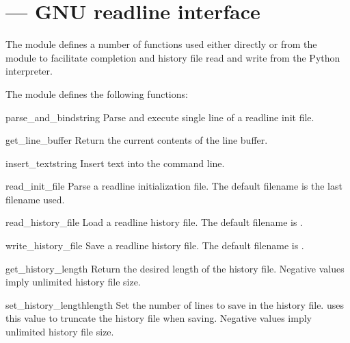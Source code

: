 \section{ ---
         GNU readline interface}



The  module defines a number of functions used either
directly or from the  module to facilitate
completion and history file read and write from the Python
interpreter.

The  module defines the following functions:


\begin{funcdesc}{parse_and_bind}{string}
Parse and execute single line of a readline init file.
\end{funcdesc}

\begin{funcdesc}{get_line_buffer}{}
Return the current contents of the line buffer.
\end{funcdesc}

\begin{funcdesc}{insert_text}{string}
Insert text into the command line.
\end{funcdesc}

\begin{funcdesc}{read_init_file}{}
Parse a readline initialization file.
The default filename is the last filename used.
\end{funcdesc}

\begin{funcdesc}{read_history_file}{}
Load a readline history file.
The default filename is .
\end{funcdesc}

\begin{funcdesc}{write_history_file}{}
Save a readline history file.
The default filename is .
\end{funcdesc}

\begin{funcdesc}{get_history_length}{}
Return the desired length of the history file.  Negative values imply
unlimited history file size.
\end{funcdesc}

\begin{funcdesc}{set_history_length}{length}
Set the number of lines to save in the history file.
 uses this value to truncate the
history file when saving.  Negative values imply unlimited history
file size.
\end{funcdesc}

